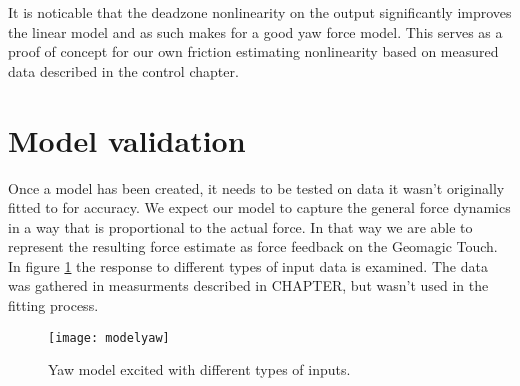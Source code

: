 It is noticable that the deadzone nonlinearity on the output significantly improves the linear model and as such makes for a good yaw force model.
This serves as a proof of concept for our own friction estimating nonlinearity based on measured data described in the control chapter.

\section{Model validation}
Once a model has been created, it needs to be tested on data it wasn't originally fitted to for accuracy.
We expect our model to capture the general force dynamics in a way that is proportional to the actual force.
In that way we are able to represent the resulting force estimate as force feedback on the Geomagic Touch.
In figure \ref{fig:final_res} the response to different types of input data is examined.
The data was gathered in measurments described in CHAPTER, but wasn't used in the fitting process.

\begin{figure}[H]
\centering
\texttt{[image: modelyaw]}
\caption{Yaw model excited with different types of inputs.}
\label{fig:final_res}
\end{figure}

